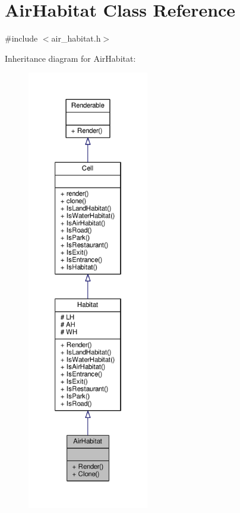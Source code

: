 \hypertarget{classAirHabitat}{}\section{Air\+Habitat Class Reference}
\label{classAirHabitat}


{\ttfamily \#include $<$air\+\_\+habitat.\+h$>$}



Inheritance diagram for Air\+Habitat\+:
\nopagebreak
\begin{figure}[H]
\begin{center}
\leavevmode
\includegraphics[height=550pt]{classAirHabitat__inherit__graph}
\end{center}
\end{figure}


